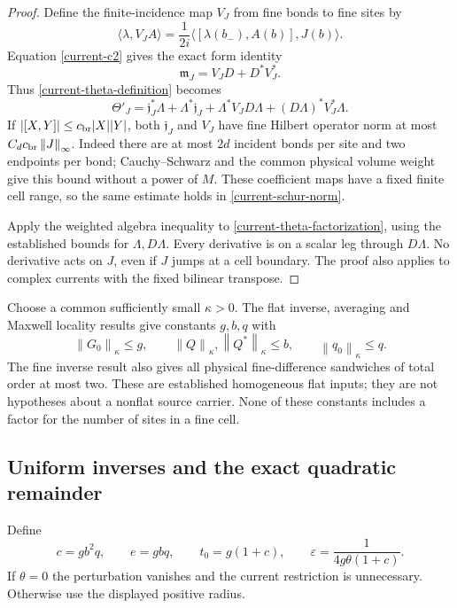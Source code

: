 \documentclass[11pt]{article}
\theoremstyle{remark}
\newcommand{\norm}[1]{\left\|#1\right\|}
\begin{document}
\begin{proof}
Define the finite-incidence map $V_J$ from fine bonds to fine sites by
\[
 \langle\lambda,V_J A\rangle
   =\frac{1}{2i}\langle[\lambda(b_-),A(b)],J(b)\rangle.
\]
Equation \eqref{current-c2} gives the exact form identity
\[
 \mathfrak m_J=V_JD+D^*V_J^*.
\]
Thus \eqref{current-theta-definition} becomes
\begin{equation}
 \Theta'_J=
 \mathfrak j_J^*\Lambda+\Lambda^*\mathfrak j_J
 +\Lambda^*V_JD\Lambda+(D\Lambda)^*V_J^*\Lambda.
 \label{current-theta-factorization}
\end{equation}
If $|[X,Y]|\le c_{\rm br}|X||Y|$, both
$\mathfrak j_J$ and $V_J$ have fine Hilbert operator norm at most
$C_d c_{\rm br}\norm{J}_\infty$. Indeed there are at most $2d$
incident bonds per site and two endpoints per bond; Cauchy--Schwarz
and the common physical volume weight give this bound without a
power of $M$. These coefficient maps have a fixed finite cell range,
so the same estimate holds in \eqref{current-schur-norm}.

Apply the weighted algebra inequality to
\eqref{current-theta-factorization}, using the established bounds for
$\Lambda,D\Lambda$. Every derivative is on a scalar leg through
$D\Lambda$. No derivative acts on $J$, even if $J$ jumps at a cell
boundary. The proof also applies to complex currents with the fixed
bilinear transpose.
\end{proof}

Choose a common sufficiently small $\kappa>0$. The flat inverse,
averaging and Maxwell locality results give constants $g,b,q$ with
\begin{equation}
 \norm{G_0}_\kappa\le g,
 \qquad \norm{Q}_\kappa,\norm{Q^*}_\kappa\le b,
 \qquad \norm{q_0}_\kappa\le q.
 \label{current-input-bounds}
\end{equation}
The fine inverse result also gives all physical fine-difference
sandwiches of total order at most two. These are established
homogeneous flat inputs; they are not hypotheses about a nonflat
source carrier. None of these constants includes a factor for the
number of sites in a fine cell.

\subsection{Uniform inverses and the exact quadratic remainder}
\label{current-neighborhood-section}

Define
\begin{equation}
 c=gb^2q,\qquad e=gbq,\qquad t_0=g(1+c),\qquad
 \varepsilon=\frac{1}{4g\theta(1+c)}.
 \label{current-radius}
\end{equation}
If $\theta=0$ the perturbation vanishes and the current restriction is
unnecessary. Otherwise use the displayed positive radius.
\end{document}
